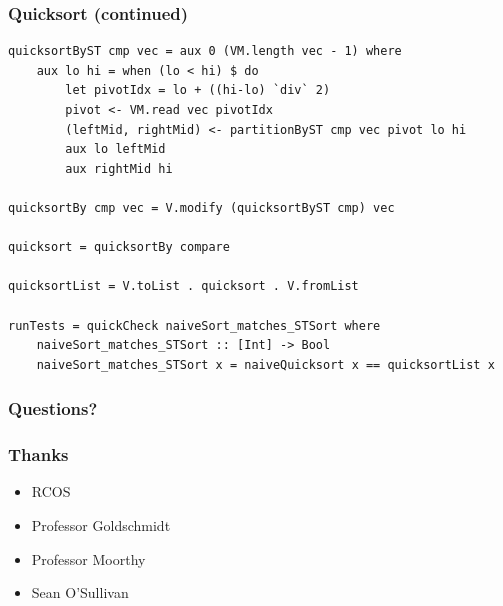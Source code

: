 \documentclass{beamer}
\begin{document}
\begin{frame}[fragile]
\frametitle{Quicksort (continued)}
\begin{Verbatim}[frame=single, fontsize=\scriptsize]
quicksortByST cmp vec = aux 0 (VM.length vec - 1) where
    aux lo hi = when (lo < hi) $ do
        let pivotIdx = lo + ((hi-lo) `div` 2)
        pivot <- VM.read vec pivotIdx
        (leftMid, rightMid) <- partitionByST cmp vec pivot lo hi
        aux lo leftMid 
        aux rightMid hi

quicksortBy cmp vec = V.modify (quicksortByST cmp) vec

quicksort = quicksortBy compare

quicksortList = V.toList . quicksort . V.fromList

runTests = quickCheck naiveSort_matches_STSort where
    naiveSort_matches_STSort :: [Int] -> Bool
    naiveSort_matches_STSort x = naiveQuicksort x == quicksortList x
\end{Verbatim}
\end{frame}

\begin{frame}[fragile]
\frametitle{Questions?}
\end{frame}

\begin{frame}[fragile]
\frametitle{Thanks}
\begin{itemize}
\item RCOS
\item Professor Goldschmidt
\item Professor Moorthy
\item Sean O'Sullivan
\end{itemize}
\end{frame}
\end{document}
